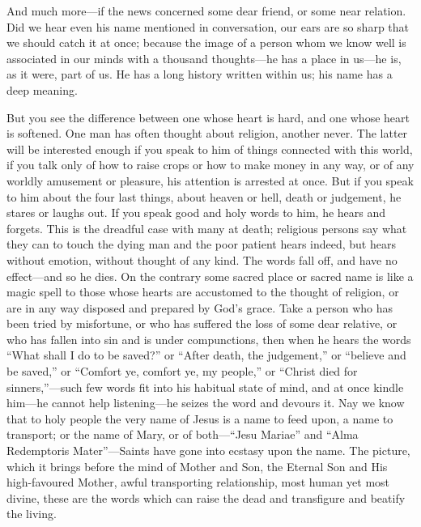 And much more—if the news concerned some dear
friend, or some near relation. Did we hear even his name mentioned in
conversation, our ears are so sharp that we should catch it at once;
because the image of a person whom we know well is associated in our
minds with a thousand thoughts—he has a place in us—he is, as it
were, part of us. He has a long history written within us; his name
has a deep meaning.

But you see the difference between one whose
heart is hard, and one whose heart is softened. One man has often
thought about religion, another never. The latter will be interested
enough if you speak to him of things connected with this world, if you
talk only of how to raise crops or how to make money in any way, or of
any worldly amusement or pleasure, his attention is arrested at once.
But if you speak to him about the four last things, about heaven or
hell, death or judgement, he stares or laughs out. If you speak good
and holy words to him, he hears and forgets. This is the dreadful case
with many at death; religious persons say what they can to touch the
dying man and the poor patient hears indeed, but hears without
emotion, without thought of any kind. The words fall off, and have no
effect—and so he dies. On the contrary some sacred place or sacred
name is like a magic spell to those whose hearts are accustomed to the
thought of religion, or are in any way disposed and prepared by
God's grace. Take a person who has been tried by misfortune, or who
has suffered the loss of some dear relative, or who has fallen into
sin and is under compunctions, then when he hears the words ``What
shall I do to be saved?'' or ``After death, the judgement,'' or
``believe and be saved,'' or ``Comfort ye, comfort ye, my
people,'' or ``Christ died for sinners,''—such few words fit into
his habitual state of mind, and at once kindle him—he cannot help
listening—he seizes the word and devours it. Nay we know that to
holy people the very name of Jesus is a name to feed upon, a name to
transport; or the name of Mary, or of both—``Jesu Mariae'' and
``Alma Redemptoris Mater''—Saints have gone into ecstasy upon the
name. The picture, which it brings before the mind of Mother and Son,
the Eternal Son and His high-favoured Mother, awful transporting
relationship, most human yet most divine, these are the words which
can raise the dead and transfigure and beatify the living.


